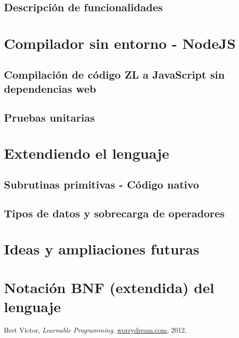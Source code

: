 \documentclass{report}
\begin{document}
	\section{Descripción de funcionalidades}
	
	\chapter{Compilador sin entorno - NodeJS}
	
	\section{Compilación de código ZL a JavaScript sin dependencias web}
	
	\section{Pruebas unitarias}
	
	\chapter{Extendiendo el lenguaje}
	
	\section{Subrutinas primitivas - Código nativo}
	
	\section{Tipos de datos y sobrecarga de operadores} 
	
	\chapter{Ideas y ampliaciones futuras} 
	
	\appendix
	\chapter{Notación BNF (extendida) del lenguaje} \label{app:a}
	
	
	\begin{thebibliography}{9}
		
		Bret Victor,
		\emph{Learnable Programming},
		\href{http://worrydream.com/#!/LearnableProgramming}{worrydream.com},
		2012.
		
	\end{thebibliography}
	
\end{document}
